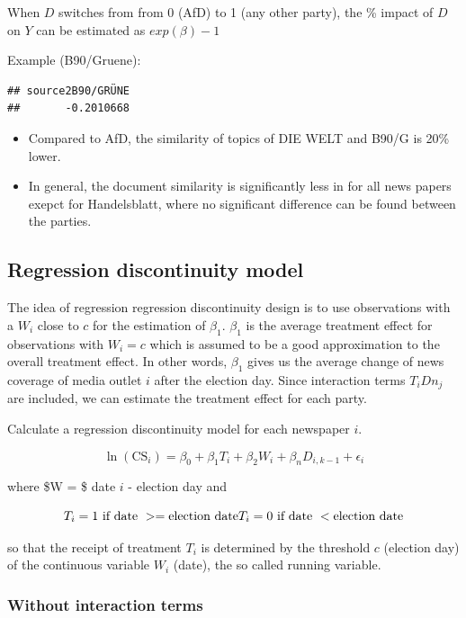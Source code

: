 \documentclass[
]{article}
\providecommand{\tightlist}{%
  \setlength{\itemsep}{0pt}\setlength{\parskip}{0pt}}
\begin{document}
When \(D\) switches from from 0 (AfD) to 1 (any other party), the \%
impact of \(D\) on \(Y\) can be estimated as \(exp(\beta)-1\)

Example (B90/Gruene):

\begin{verbatim}
## source2B90/GRÜNE 
##       -0.2010668
\end{verbatim}

\begin{itemize}
\tightlist
\item
  Compared to AfD, the similarity of topics of DIE WELT and B90/G is
  20\% lower.
\item
  In general, the document similarity is significantly less in for all
  news papers exepct for Handelsblatt, where no significant difference
  can be found between the parties.
\end{itemize}

\hypertarget{regression-discontinuity-model}{%
\subsection{Regression discontinuity
model}\label{regression-discontinuity-model}}

The idea of regression regression discontinuity design is to use
observations with a \(W_i\) close to \(c\) for the estimation of
\(\beta_1\). \(\beta_1\) is the average treatment effect for
observations with \(W_i = c\) which is assumed to be a good
approximation to the overall treatment effect. In other words,
\(\beta_1\) gives us the average change of news coverage of media outlet
\(i\) after the election day. Since interaction terms \(T_iDn_{j}\) are
included, we can estimate the treatment effect for each party.

Calculate a regression discontinuity model for each newspaper \(i\).

\[
\ln(\text{CS}_{i})=\beta_0+\beta_1T_i+\beta_2W_{i}+\beta_nD_{i,k-1}+\epsilon_i
\]

where \$W = \$ date \(i\) - election day and

\[
T_i = 1 \text{ if date } >= \text{election date} \\
T_i = 0 \text{ if date } < \text{election date}
\]

so that the receipt of treatment \(T_i\) is determined by the threshold
\(c\) (election day) of the continuous variable \(W_i\) (date), the so
called running variable.

\hypertarget{without-interaction-terms}{%
\subsubsection{Without interaction
terms}\label{without-interaction-terms}}
\end{document}
